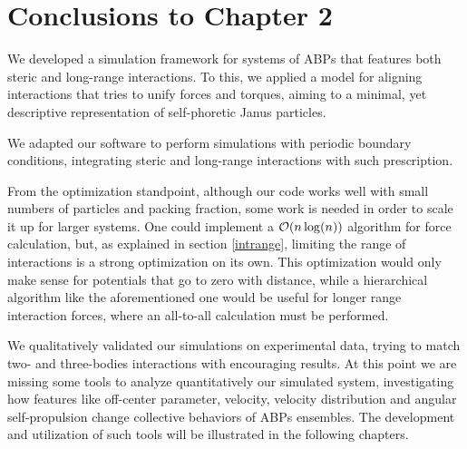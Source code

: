 \documentclass[../../master_thesis_np.tex]{subfiles}
\begin{document}
	\section{Conclusions to Chapter 2}
	We developed a simulation framework for systems of ABPs that features both steric and long-range interactions.
	To this, we applied a model for aligning interactions that tries to unify forces and torques, aiming to a minimal, yet descriptive representation of self-phoretic Janus particles.
	
	We adapted our software to perform simulations with periodic boundary conditions, integrating steric and long-range interactions with such prescription.
	
	From the optimization standpoint, although our code works well with small numbers of particles and packing fraction, some work is needed in order to scale it up for larger systems.
	One could implement a $\order{n \log(n)}$ algorithm \cite{barnes_hierarchical_1986} for force calculation, but, as explained in section \ref{intrange}, limiting the range of interactions is a strong optimization on its own.
	This optimization would only make sense for potentials that go to zero with distance, while a hierarchical algorithm like the aforementioned one would be useful for longer range interaction forces, where an all-to-all calculation must be performed.
	
	We qualitatively validated our simulations on experimental data, trying to match two- and three-bodies interactions with encouraging results.
	At this point we are missing some tools to analyze quantitatively our simulated system, investigating how features like off-center parameter, velocity, velocity distribution and angular self-propulsion change collective behaviors of ABPs ensembles.
	The development and utilization of such tools will be illustrated in the following chapters.
	
\end{document}
